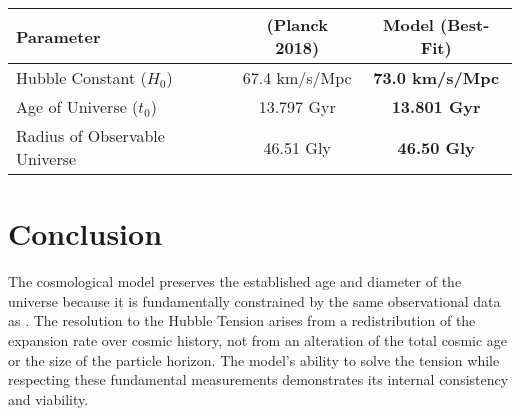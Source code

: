 \documentclass{BSpacePaper} %
\begin{document}
\begin{center}
    \captionsetup{type=table}
    \begin{tabular}{@{}lcc@{}}
    \toprule
    \textbf{Parameter} & \textbf{\lcdm{} (Planck 2018)} & \textbf{\bspace{} Model (Best-Fit)} \\ \midrule
    Hubble Constant ($H_0$) & 67.4 km/s/Mpc & \textbf{73.0 km/s/Mpc} \\
    Age of Universe ($t_0$) & 13.797 Gyr & \textbf{13.801 Gyr} \\
    Radius of Observable Universe & 46.51 Gly & \textbf{46.50 Gly} \\ \bottomrule
    \end{tabular}
\end{center}

\section{Conclusion}
The \bspace{} cosmological model preserves the established age and diameter of the universe because it is fundamentally constrained by the same observational data as \lcdm{}. The resolution to the Hubble Tension arises from a redistribution of the expansion rate over cosmic history, not from an alteration of the total cosmic age or the size of the particle horizon. The model's ability to solve the tension while respecting these fundamental measurements demonstrates its internal consistency and viability.
\end{document}
